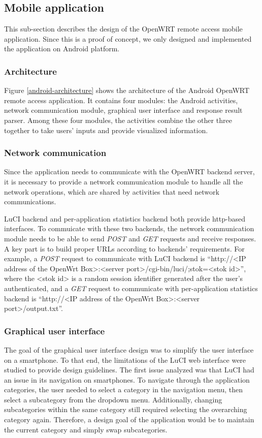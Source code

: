 \subsection{Mobile application}
This sub-section describes the design of the OpenWRT remote access mobile application. Since this is a proof of concept, we only designed and implemented the application on Android platform.

\subsubsection{Architecture}
Figure \ref{android-architecture} shows the architecture of the Android OpenWRT remote access application. It contains four modules: the Android activities, network communication module, graphical user interface and response result parser. Among these four modules, the activities combine the other three together to take users' inputs and provide visualized information.

\subsubsection{Network communication}
Since the application needs to communicate with the OpenWRT backend server, it is necessary to provide a network communication module to handle all the network operations, which are shared by activities that need network communications.

LuCI backend and per-application statistics backend both provide http-based interfaces. To commuicate with these two backends, the network communication module needs to be able to send \textit{POST} and \textit{GET} requests and receive responses. A key part is to build proper URLs according to backends' requirements. For example, a \textit{POST} request to communicate with LuCI backend is ``http://<IP address of the OpenWrt Box>:<server port>/cgi-bin/luci/;stok=<stok id>'', where the <stok id> is a random session identifier generated after the user's authenticated, and a \textit{GET} request to communicate with per-application statistics backend is ``http://<IP address of the OpenWrt Box>:<server port>/output.txt''.

\subsubsection{Graphical user interface}
The goal of the graphical user interface design was to simplify the user interface on a smartphone. To that end, the limitations of the LuCI web interface were studied to provide design guidelines. The first issue analyzed was that LuCI had an issue in its navigation on smartphones. To navigate through the application categories, the user needed to select a category in the navigation menu, then select a subcategory from the dropdown menu. Additionally, changing subcategories within the same category still required selecting the overarching category again. Therefore, a design goal of the application would be to maintain the current category and simply swap subcategories.
	
